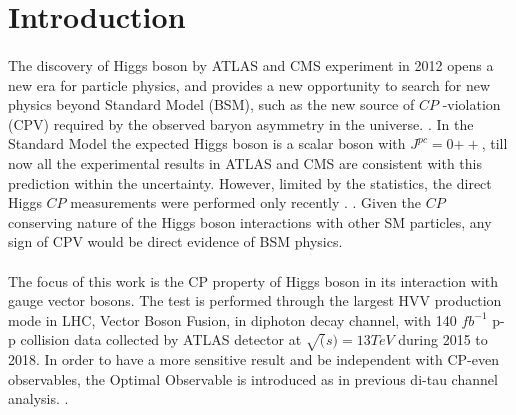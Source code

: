 \section{Introduction}
\label{sec:intro}


\paragraph{}The discovery of Higgs boson by ATLAS and CMS experiment in 2012 opens a new era for particle physics, and provides a new opportunity to search for new physics beyond Standard Model (BSM), such as the new source of $CP$ -violation (CPV) required by the observed baryon asymmetry in the universe. . In the Standard Model the expected Higgs boson is a scalar boson with $J^{pc} = 0{++}$, till now all the experimental results in ATLAS and CMS are consistent with this prediction within the uncertainty.  However, limited by the statistics, the direct Higgs $CP$ measurements were performed only recently \cite{HIGG-VBFHtautau,HIGG-ttHyy,CMS-HIG-17-034,CMS-HIG-19-013}. .
Given the $CP$ conserving nature of the Higgs boson interactions with other SM particles, any sign of CPV would be direct evidence of BSM physics.


\paragraph{} The focus of this work is the CP property of Higgs boson in its interaction with gauge vector bosons. The test is performed through the largest HVV production mode in LHC, Vector Boson Fusion, in diphoton decay channel, with 140 $fb^{-1}$ p-p collision data collected by ATLAS detector at $\sqrt(s)=13TeV$ during 2015 to 2018. In order to have a more sensitive result and be independent with CP-even observables, the Optimal Observable is introduced as in previous di-tau channel analysis. .



